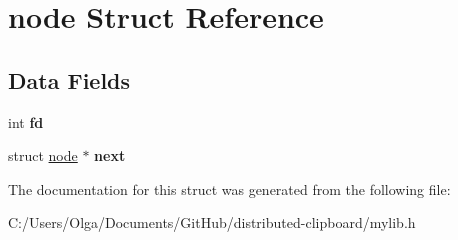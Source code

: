 \hypertarget{structnode}{}\section{node Struct Reference}
\label{structnode}
\subsection*{Data Fields}
\begin{DoxyCompactItemize}
\item 
\mbox{\label{structnode_a6f8059414f0228f0256115e024eeed4b}} 
int {\bfseries fd}
\item 
\mbox{\label{structnode_a0dc1b6470487aa86d9936e3cab8b95be}} 
struct \mbox{\hyperlink{structnode}{node}} $\ast$ {\bfseries next}
\end{DoxyCompactItemize}


The documentation for this struct was generated from the following file\+:\begin{DoxyCompactItemize}
\item 
C\+:/\+Users/\+Olga/\+Documents/\+Git\+Hub/distributed-\/clipboard/mylib.\+h\end{DoxyCompactItemize}
